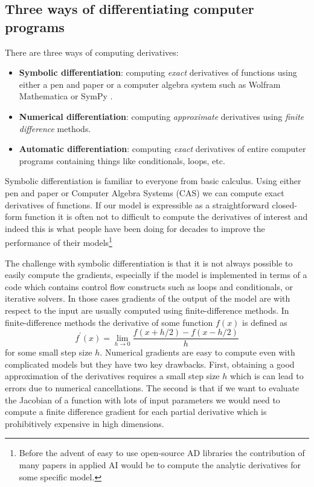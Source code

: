 \documentclass[12pt,dvipsnames]{report}
\newcommand{\ssf}[1]{\textsf{#1}}
\begin{document}
\subsection{Three ways of differentiating computer programs}
There are three ways of computing derivatives:
\begin{itemize}
    \item \textbf{Symbolic differentiation}: computing \emph{exact} derivatives of 
    functions using either a pen and paper or a computer algebra system such as 
    \ssf{Wolfram Mathematica} or \ssf{SymPy} \citep{10.7717/peerj-cs.103}.
    \item \textbf{Numerical differentiation}: computing \emph{approximate} derivatives 
    using \textsl{finite difference}  methods.
    \item \textbf{Automatic differentiation}: computing \emph{exact} derivatives of entire 
    computer programs containing things like conditionals, loops, etc.
\end{itemize}
Symbolic differentiation is familiar to everyone from basic calculus. Using either 
pen and paper  or Computer Algebra Systems (CAS) we can compute exact 
derivatives of functions. 
If our model is expressible as a straightforward closed-form function it is 
often not to difficult to compute the derivatives of interest and indeed this 
is what people have been doing for decades to improve the performance of their
models\footnote{Before the advent of easy to use open-source AD libraries 
the contribution of many papers in applied AI would be to compute the analytic 
derivatives for some specific model.}

The challenge with symbolic differentiation is that it is not always possible 
to easily compute the gradients, especially if the model is implemented in terms 
of a code which contains control flow constructs such as loops and conditionals, 
or iterative solvers. In those cases gradients of the output of the model 
are with respect to the input are usually computed using finite-difference 
methods. In finite-difference methods the derivative of some function $f(x)$
is defined as 
\begin{equation}
    f^\prime(x)=\lim _{h \rightarrow 0} \frac{f(x+h / 2)-f(x-h / 2)}{h}
\end{equation}
for some small step size $h$. Numerical gradients are easy to compute even with 
complicated models but they have two key drawbacks. First, obtaining a 
good approximation of the derivatives requires a small step size $h$ which is 
can lead to errors due to numerical cancellations.
The second is that if we want to evaluate the Jacobian of a function with lots 
of input parameters we would need to compute a finite difference gradient 
for each partial derivative which is prohibitively expensive in high dimensions.
\end{document}
